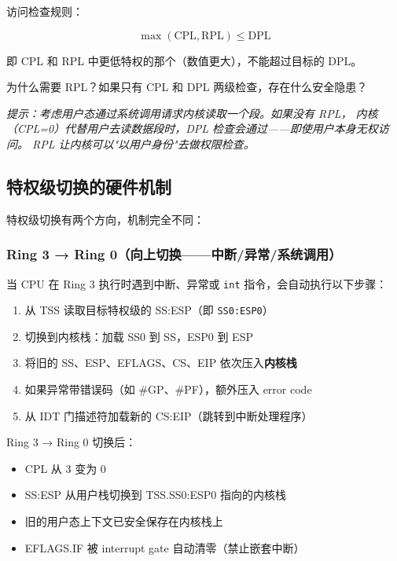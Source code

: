 \noindent 访问检查规则：

\[
  \max(\text{CPL}, \text{RPL}) \le \text{DPL}
\]

即 CPL 和 RPL 中更低特权的那个（数值更大），不能超过目标的 DPL。

\begin{thinkbox}
为什么需要 RPL？如果只有 CPL 和 DPL 两级检查，存在什么安全隐患？

\emph{提示：考虑用户态通过系统调用请求内核读取一个段。如果没有 RPL，
内核（CPL=0）代替用户去读数据段时，DPL 检查会通过——即使用户本身无权访问。
RPL 让内核可以"以用户身份"去做权限检查。}
\end{thinkbox}

\subsection{特权级切换的硬件机制}
\label{sec:tss-hw-switch}

特权级切换有两个方向，机制完全不同：

\subsubsection{Ring 3 → Ring 0（向上切换——中断/异常/系统调用）}

当 CPU 在 Ring 3 执行时遇到中断、异常或 \texttt{int} 指令，会自动执行以下步骤：

\begin{enumerate}
  \item 从 TSS 读取目标特权级的 SS:ESP（即 \texttt{SS0:ESP0}）
  \item 切换到内核栈：加载 SS0 到 SS，ESP0 到 ESP
  \item 将旧的 SS、ESP、EFLAGS、CS、EIP 依次压入\textbf{内核栈}
  \item 如果异常带错误码（如 \#GP、\#PF），额外压入 error code
  \item 从 IDT 门描述符加载新的 CS:EIP（跳转到中断处理程序）
\end{enumerate}

\begin{cpustate}
Ring 3 → Ring 0 切换后：
\begin{itemize}
  \item CPL 从 3 变为 0
  \item SS:ESP 从用户栈切换到 TSS.SS0:ESP0 指向的内核栈
  \item 旧的用户态上下文已安全保存在内核栈上
  \item EFLAGS.IF 被 interrupt gate 自动清零（禁止嵌套中断）
\end{itemize}
\end{cpustate}

